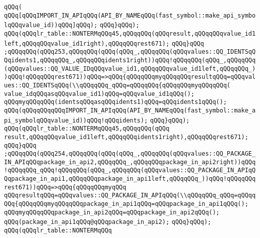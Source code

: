 \verb|qQQq(|\newline
\verb|qQQq[qQQqIMPORT_IN_APIqQQq(API_BY_NAMEqQQq(fast_symbol::make_api_symbolqQQqvalue_id))qQQq]qQQq);|\newline
\verb|qQQq}qQQq);|\newline
\verb|qQQq(qQQqlr_table::NONTERMqQQq45,qQQqqQQq(qQQqresult,qQQqqQQqvalue_id1left,qQQqqQQqvalue_id1right),qQQqqQQqrest671);|\newline
\verb|qQQq}qQQq|\newline
\verb|;qQQqqQQq(qQQq253,qQQqqQQq(qQQq(qQQq_,qQQqqQQq(qQQqvalues::QQ_IDENTSqQQqidents1,qQQqqQQq_,qQQqqQQqidents1right))qQQq!qQQqqQQq(qQQq_,qQQqqQQq(qQQqvalues::QQ_VALUE_IDqQQqvalue_id1,qQQqqQQqvalue_id1left,qQQqqQQq_))qQQq!qQQqqQQqrest671))qQQq=>qQQq{qQQqqQQqmyqQQqqQQqresultqQQq=qQQqvalues::QQ_IDENTSqQQq(\\qQQqqQQq_qQQq=qQQqqQQq{qQQqqQQqmyqQQqqQQq(|\newline
\verb|value_idqQQqasqQQqvalue_id1)qQQq=qQQqvalue_id1qQQq();|\newline
\verb|qQQqmyqQQqqQQq(identsqQQqasqQQqidents1)qQQq=qQQqidents1qQQq();|\newline
\verb|qQQq(qQQqqQQqqQQqIMPORT_IN_APIqQQq(API_BY_NAMEqQQq(fast_symbol::make_api_symbolqQQqvalue_id))qQQq!qQQqidents);|\newline
\verb|qQQq}qQQq);|\newline
\verb|qQQq(qQQqlr_table::NONTERMqQQq45,qQQqqQQq(qQQq|\newline
\verb|result,qQQqqQQqvalue_id1left,qQQqqQQqidents1right),qQQqqQQqrest671);|\newline
\verb|qQQq}qQQq|\newline
\verb|;qQQqqQQq(qQQq254,qQQqqQQq(qQQq(qQQq_,qQQqqQQq(qQQqvalues::QQ_PACKAGE_IN_APIqQQqpackage_in_api2,qQQqqQQq_,qQQqqQQqpackage_in_api2right))qQQq!qQQqqQQq_qQQq!qQQqqQQq(qQQq_,qQQqqQQq(qQQqvalues::QQ_PACKAGE_IN_APIqQQqpackage_in_api1,qQQqqQQqpackage_in_api1left,qQQqqQQq_))qQQq!qQQqqQQqrest671))qQQq=>qQQq{qQQqqQQqmyqQQq|\newline
\verb|qQQqresultqQQq=qQQqvalues::QQ_PACKAGE_IN_APIqQQq(\\qQQqqQQq_qQQq=qQQqqQQq{qQQqqQQqmyqQQqqQQqpackage_in_api1qQQq=qQQqpackage_in_api1qQQq();|\newline
\verb|qQQqmyqQQqqQQqpackage_in_api2qQQq=qQQqpackage_in_api2qQQq();|\newline
\verb|qQQq(package_in_api1qQQq@qQQqpackage_in_api2);|\newline
\verb|qQQq}qQQq);|\newline
\verb|qQQq(qQQqlr_table::NONTERMqQQq|\newline
